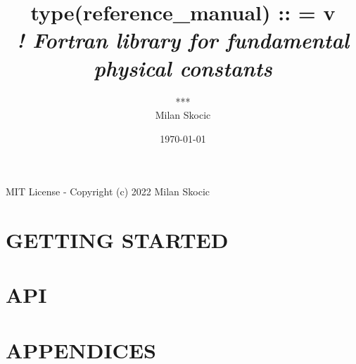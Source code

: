 \documentclass[11pt,a4paper,twoside,openright]{book}
\title{
\vspace{1cm}
{\sc \huge type(reference\_manual) :: \FPMNAME = v\FPMVERSION} \\ 
\vspace{0.25cm}
{\it \normalsize ! Fortran library for fundamental physical constants }\\
}
\author{*** \\ Milan Skocic}
\date{\today }
\begin{document}
\pagestyle{empty}
\maketitle
{\hspace{1cm} \par
\vfill 
\hfill MIT License - Copyright (c) 2022 Milan Skocic \hfill}
\frontmatter 
\pagestyle{plain}
\tableofcontents

%



\mainmatter
\pagestyle{fancy}
\part{GETTING STARTED}



\part{API}

\part{APPENDICES}
%



\backmatter
\pagestyle{plain}
\nocite{*}
\printbibliography[heading=bibintoc]
\printindex
\end{document}

